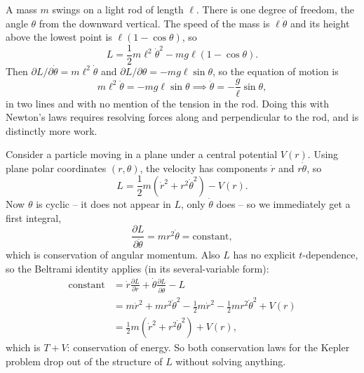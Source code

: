 \documentclass[a4paper]{scrartcl}
\begin{document}
\begin{example}
	A mass $m$ swings on a light rod of length $\ell$. There is one degree of freedom, the angle $\theta$ from the downward vertical. The speed of the mass is $\ell\dot\theta$ and its height above the lowest point is $\ell(1 - \cos\theta)$, so
	$$
	L = \frac{1}{2}m\ell^2\dot\theta^2 - mg\ell(1 - \cos\theta).
	$$
	Then $\partial L/\partial \dot\theta = m\ell^2\dot\theta$ and $\partial L/\partial\theta = -mg\ell\sin\theta$, so the equation of motion is
	$$
	m\ell^2\ddot\theta = -mg\ell\sin\theta \implies \ddot\theta = -\frac{g}{\ell}\sin\theta,
	$$
	in two lines and with no mention of the tension in the rod. Doing this with Newton's laws requires resolving forces along and perpendicular to the rod, and is distinctly more work.
\end{example}

\begin{example}
	Consider a particle moving in a plane under a central potential $V(r)$. Using plane polar coordinates $(r, \theta)$, the velocity has components $\dot r$ and $r\dot\theta$, so
	$$
	L = \frac{1}{2}m\left(\dot r^2 + r^2\dot\theta^2\right) - V(r).
	$$
	Now $\theta$ is cyclic -- it does not appear in $L$, only $\dot\theta$ does -- so we immediately get a first integral,
	$$
	\frac{\partial L}{\partial \dot\theta} = m r^2\dot\theta = \text{constant},
	$$
	which is conservation of angular momentum. Also $L$ has no explicit $t$-dependence, so the Beltrami identity applies (in its several-variable form):
	\begin{align*}
		\text{constant} &= \dot r \frac{\partial L}{\partial \dot r} + \dot\theta\frac{\partial L}{\partial \dot\theta} - L \\
		&= m\dot r^2 + mr^2\dot\theta^2 - \frac12 m \dot r^2 - \frac12 mr^2\dot\theta^2 + V(r) \\
		&= \frac{1}{2}m\left(\dot r^2 + r^2\dot\theta^2\right) + V(r),
	\end{align*}
	which is $T + V$: conservation of energy. So both conservation laws for the Kepler problem drop out of the structure of $L$ without solving anything.
\end{example}
\end{document}
